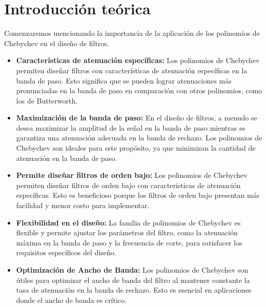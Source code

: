 \newpage
\section{Introducción teórica}
Comenzaremos mencionando la importancia de la aplicación de los polinomios de Chebychev en el diseño de filtros.

\begin{itemize}
	\item \textbf{Características de atenuación específicas:} Los polinomios de Chebychev permiten diseñar filtros con características de atenuación específicas en la banda de paso. Esto significa que se pueden lograr atenuaciones más pronunciadas en la banda de paso en comparación con otros polinomios, como los de Butterworth.
	
	\item \textbf{Maximización de la banda de paso:} En el diseño de filtros, a menudo se desea maximizar la amplitud de la señal en la banda de paso mientras se garantiza una atenuación adecuada en la banda de rechazo. Los polinomios de Chebychev son ideales para este propósito, ya que minimizan la cantidad de atenuación en la banda de paso.
	
	\item \textbf{Permite diseñar filtros de orden bajo:} Los polinomios de Chebychev permiten diseñar filtros de orden bajo con características de atenuación específicas. Esto es beneficioso porque los filtros de orden bajo presentan más facilidad y menor costo para implementar.
	
	\item \textbf{Flexibilidad en el diseño:} La familia de polinomios de Chebychev es flexible y permite ajustar los parámetros del filtro, como la atenuación máxima en la banda de paso y la frecuencia de corte, para satisfacer los requisitos específicos del diseño.
	
	\item \textbf{Optimización de Ancho de Banda:} Los polinomios de Chebychev son útiles para optimizar el ancho de banda del filtro al mantener constante la tasa de atenuación en la banda de rechazo. Esto es esencial en aplicaciones donde el ancho de banda es crítico.
\end{itemize}